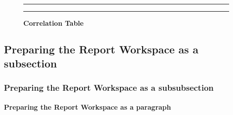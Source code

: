 \documentclass[]{article}
\begin{document}
\begin{figure}[!ht]
    \hrule
    \caption{ \textbf{Correlation Table} }
    \begin{center}
    \end{center}
    \label{fig:correlation}
    \hrule
\end{figure}

\newpage

\newpage

\subsection{Preparing the Report Workspace as a subsection}
\label{sec:appendix-setup}

\subsubsection{Preparing the Report Workspace as a subsubsection}
\label{sec:appendix-setup2}

\paragraph{Preparing the Report Workspace as a paragraph}
\label{sec:appendix-setup3}
\end{document}
